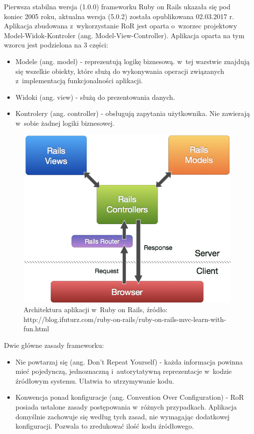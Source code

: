 \documentclass[printmode]{mgr}
\begin{document}
Pierwsza stabilna wersja (1.0.0) frameworku Ruby on Rails ukazała się pod koniec 2005 roku, aktualna wersja (5.0.2) została opublikowana 02.03.2017 r. Aplikacja zbudowana z~wykorzystanie RoR jest oparta o~wzorzec projektowy Model-Widok-Kontroler\cite{rails_agile} (ang. Model-View-Controller). Aplikacja oparta na tym wzorcu jest podzielona na 3 części:
\begin{itemize}
  \item Modele (ang. model) - reprezentują logikę biznesową. w~tej warstwie znajdują się wszelkie obiekty, które służą do wykonywania operacji związanych z~implementacją funkcjonalności aplikacji.
  \item Widoki (ang. view) - służą do prezentowania danych. 
  \item Kontrolery (ang. controller) - obsługują zapytania użytkownika. Nie zawierają w~sobie żadnej logiki biznesowej.
\end{itemize}

\begin{figure}[H]
  \centering
  \includegraphics[width=1\linewidth]{obrazki/rails_mvc}
  \caption{Architektura aplikacji w~Ruby on Rails, źródło: http://blog.ifuturz.com/ruby-on-rails/ruby-on-rails-mvc-learn-with-fun.html}
  \label{fig:rails_mvc}
\end{figure}
\newpage
Dwie główne zasady frameworku\cite{doc_rails}:

\begin{itemize}
  \item Nie powtarzaj się (ang. Don't Repeat Yourself) - każda informacja powinna mieć pojedynczą, jednoznaczną i~autorytatywną reprezentacje w~kodzie źródłowym systemu. Ułatwia to utrzymywanie kodu.
  \item Konwencja ponad konfiguracje (ang. Convention Over Configuration) - RoR posiada ustalone zasady postępowania w~różnych przypadkach. Aplikacja domyślnie zachowuje się według tych zasad, nie wymagając dodatkowej konfiguracji. Pozwala to zredukować ilość kodu źródłowego.
\end{itemize}
\end{document}
